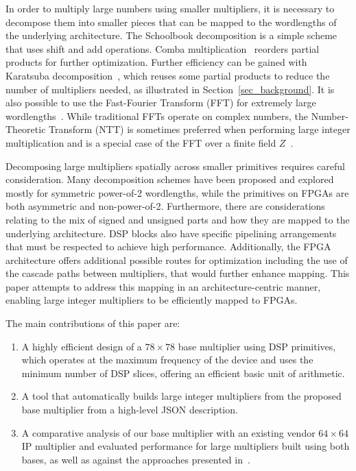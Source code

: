 \documentclass[conference]{IEEEtran}
\begin{document}
In order to multiply large numbers using smaller multipliers, it is necessary to decompose them into smaller pieces that can be mapped to the wordlengths of the underlying architecture.
The Schoolbook decomposition is a simple scheme that uses shift and add operations. 
Comba multiplication~\cite{combaExponentiationCryptosystemsIBM1990} reorders partial products for further optimization.
Further efficiency can be gained with Karatsuba decomposition~\cite{karatsubaOriginalPaper}, which reuses some partial products to reduce the number of multipliers needed, as illustrated in Section~\ref{sec_background}. 
It is also possible to use the Fast-Fourier Transform (FFT) for extremely large wordlengths~\cite{yapFFTquickmul2000,emerenciaFFTMultiplyingHugeIntegers,tukeyFFTAlgorithmMachineCalculation1965}. 
While traditional FFTs operate on complex numbers, the Number-Theoretic Transform (NTT) is sometimes preferred when performing large integer multiplication and is a special case of the FFT over a finite field $Z$~\cite{strassenNTTSchnelleMultiplikationGrosser1971,weemsNTTHighPrecisionInteger2011}.

Decomposing large multipliers spatially across smaller primitives requires careful consideration.
Many decomposition schemes have been proposed and explored mostly for symmetric power-of-2 wordlengths, while the primitives on FPGAs are both asymmetric and non-power-of-2.
Furthermore, there are considerations relating to the mix of signed and unsigned parts and how they are mapped to the underlying architecture.
DSP blocks also have specific pipelining arrangements that must be respected to achieve high performance.
Additionally, the FPGA architecture offers additional possible routes for optimization including the use of the cascade paths between multipliers, that would further enhance mapping.
This paper attempts to address this mapping in an architecture-centric manner, enabling large integer multipliers to be efficiently mapped to FPGAs.

The main contributions of this paper are: 
\begin{enumerate}
    \item A highly efficient design of a $78\times78$ base multiplier using DSP primitives, which operates at the maximum frequency of the device and uses the minimum number of DSP slices, offering an efficient basic unit of arithmetic. 
    \item A tool that automatically builds large integer multipliers from the proposed base multiplier from a high-level JSON description. 
    \item A comparative analysis of our base multiplier with an existing vendor $64\times64$ IP multiplier and evaluated performance for large multipliers built using both bases, as well as against the approaches presented in~\cite{zhangIMpressLargeInteger2022}. 
\end{enumerate}
\end{document}
